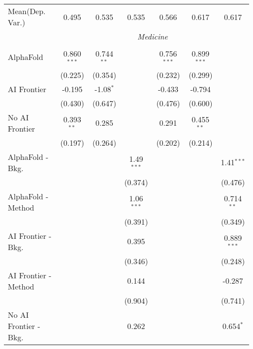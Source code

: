 \begin{tabular}{lcccccc}
Mean(Dep. Var.) & 0.495 & 0.535 & 0.535 & 0.566 & 0.617 & 0.617 \\
 & \multicolumn{6}{c}{\textit{Medicine}} \\ \\
   AlphaFold               & 0.860$^{***}$ & 0.744$^{**}$ &              & 0.756$^{***}$ & 0.899$^{***}$ &   \\   
                           & (0.225)       & (0.354)      &              & (0.232)       & (0.299)       &   \\   
   AI Frontier             & -0.195        & -1.08$^{*}$  &              & -0.433        & -0.794        &   \\   
                           & (0.430)       & (0.647)      &              & (0.476)       & (0.600)       &   \\   
   No AI Frontier          & 0.393$^{**}$  & 0.285        &              & 0.291         & 0.455$^{**}$  &   \\   
                           & (0.197)       & (0.264)      &              & (0.202)       & (0.214)       &   \\   
   AlphaFold - Bkg.        &               &              & 1.49$^{***}$ &               &               & 1.41$^{***}$\\   
                           &               &              & (0.374)      &               &               & (0.476)\\   
   AlphaFold - Method      &               &              & 1.06$^{***}$ &               &               & 0.714$^{**}$\\   
                           &               &              & (0.391)      &               &               & (0.349)\\   
   AI Frontier - Bkg.      &               &              & 0.395        &               &               & 0.889$^{***}$\\   
                           &               &              & (0.346)      &               &               & (0.248)\\   
   AI Frontier - Method    &               &              & 0.144        &               &               & -0.287\\   
                           &               &              & (0.904)      &               &               & (0.741)\\   
   No AI Frontier - Bkg.   &               &              & 0.262        &               &               & 0.654$^{*}$\\   

\end{tabular}
